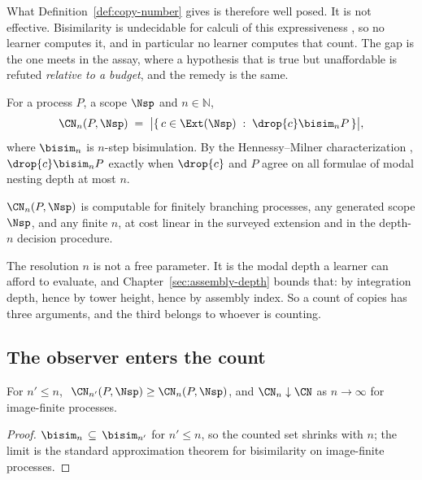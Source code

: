 What Definition~\ref{def:copy-number} gives is therefore well posed. It is
not effective. Bisimilarity is undecidable for calculi of this
expressiveness \cite{sangiorgi}, so no learner computes it, and in
particular no learner computes that count. The gap is the one \chSci meets
in the assay, where a hypothesis that is true but unaffordable is refuted
\emph{relative to a budget}, and the remedy is the same.

\begin{definition}
\label{scm:def:cnn}
For a process $P$, a scope $\Nsp$ and $n \in \mathbb{N}$,
\[
  \CN_n(P, \Nsp) \;=\;
  \bigl|\{\, c \in \Ext(\Nsp) \;:\; \drop{c} \bisim_n P \,\}\bigr|,
\]
where $\bisim_n$ is $n$-step bisimulation. By the Hennessy--Milner
characterization \cite{HennessyMilner1985}, $\drop{c} \bisim_n P$ exactly
when $\drop{c}$ and $P$ agree on all formulae of modal nesting depth at
most $n$.
\end{definition}

\begin{proposition}[Effectivity]
\label{scm:prop:effective}
$\CN_n(P,\Nsp)$ is computable for finitely branching processes, any
generated scope $\Nsp$, and any finite $n$, at cost linear in the surveyed
extension and in the depth-$n$ decision procedure.
\end{proposition}

The resolution $n$ is not a free parameter. It is the modal depth a
learner can afford to evaluate, and Chapter~\ref{sec:assembly-depth}
bounds that: by integration depth, hence by tower height, hence by
assembly index. So a count of copies has three arguments, and the third
belongs to whoever is counting.

\subsection{The observer enters the count}

\begin{proposition}
\label{scm:prop:mono}
For $n' \le n$, $\ \CN_{n'}(P,\Nsp) \ge \CN_n(P,\Nsp)$, and
$\CN_n \downarrow \CN$ as $n \to \infty$ for image-finite processes.
\end{proposition}

\begin{proof}
$\bisim_n \,\subseteq\, \bisim_{n'}$ for $n' \le n$, so the counted set
shrinks with $n$; the limit is the standard approximation theorem for
bisimilarity on image-finite processes.
\end{proof}

